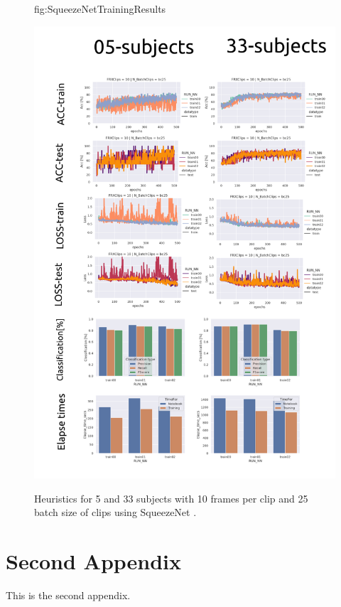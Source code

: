 \documentclass[mlabstract,twocolumn]{jmlr}
\begin{document}
\begin{figure}[htbp]
\floatconts
  {fig:SqueezeNetTrainingResults}
  {\caption{Heuristics for 5 and 33 subjects with 10 frames per clip and 25 batch size of clips using SqueezeNet \citep{iandola2017squeezenet}.}}
  {\includegraphics[width=\columnwidth]{../figures/squeezenet-05-33-subjects/versions/drawing-v00}}%
\end{figure}


\section{Second Appendix}\label{apd:second}
This is the second appendix.
\end{document}
